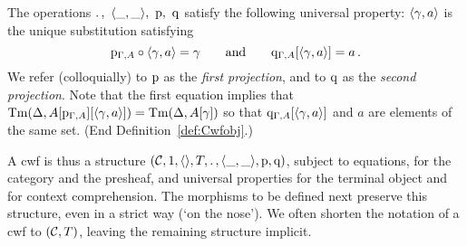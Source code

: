 \documentclass{lmcs}
\begin{document}
\begin{definition}
The operations  ${.\,},~\langle \_,\_ \rangle,~\mathrm{p},~\mathrm{q}$
satisfy the following universal property:
$\langle \gamma, a \rangle$ is the unique substitution satisfying
\[
\mathrm{p}_{\Gamma, A} \circ \langle \gamma, a \rangle = \gamma
\qquad \text{and}\qquad
\mathrm{q}_{\Gamma, A} [\langle \gamma, a \rangle] = a\,.
\]
We refer (colloquially) to $\mathrm{p}$ as the \emph{first projection},
and to $\mathrm{q}$ as the \emph{second projection}. %
{Note that the first equation implies that
$\mathrm{Tm}(\Delta,A[\mathrm{p}_{\Gamma,A}][\langle \gamma, a \rangle]) = \mathrm{Tm}(\Delta,A[\gamma])$
so that $\mathrm{q}_{\Gamma, A} [\langle \gamma, a \rangle]$ and $a$ are elements of the same set.}
(End Definition~\ref{def:Cwfobj}.)
\end{definition}



A cwf is thus a structure $({\mathcal C},1,\langle  \rangle,T,.\, , \langle \_,\_ \rangle,\mathrm{p}, \mathrm{q})$, 
subject to equations, for the category and the presheaf, and universal
properties for the terminal object and for context comprehension. 
The morphisms to be defined next preserve this structure,
even in a strict way (`on the nose').
We often shorten the notation of a cwf to $({\mathcal C},T)$, leaving the remaining
structure implicit.
\end{document}
